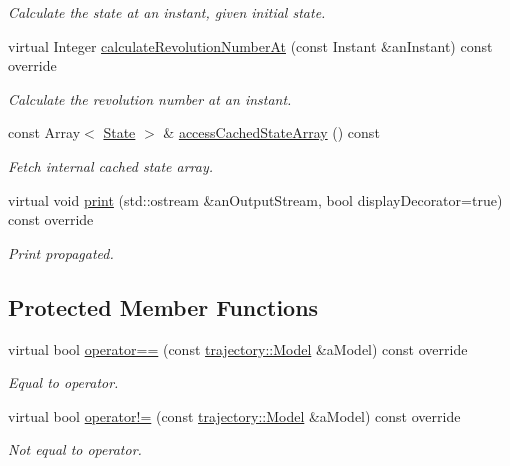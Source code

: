 \begin{DoxyCompactItemize}
\begin{DoxyCompactList}\small\item\em Calculate the state at an instant, given initial state. \end{DoxyCompactList}\item 
virtual Integer \hyperlink{classostk_1_1astro_1_1trajectory_1_1orbit_1_1models_1_1_propagated_a6360392c65494aa42aadff58ec58e49c}{calculate\+Revolution\+Number\+At} (const Instant \&an\+Instant) const override
\begin{DoxyCompactList}\small\item\em Calculate the revolution number at an instant. \end{DoxyCompactList}\item 
const Array$<$ \hyperlink{classostk_1_1astro_1_1trajectory_1_1_state}{State} $>$ \& \hyperlink{classostk_1_1astro_1_1trajectory_1_1orbit_1_1models_1_1_propagated_ab13c196dcea01238b6e1997cb46ced2b}{access\+Cached\+State\+Array} () const
\begin{DoxyCompactList}\small\item\em Fetch internal cached state array. \end{DoxyCompactList}\item 
virtual void \hyperlink{classostk_1_1astro_1_1trajectory_1_1orbit_1_1models_1_1_propagated_a2b8aa6ff5511dbe92e6a3e7f4dd6880b}{print} (std\+::ostream \&an\+Output\+Stream, bool display\+Decorator=true) const override
\begin{DoxyCompactList}\small\item\em Print propagated. \end{DoxyCompactList}\end{DoxyCompactItemize}
\subsection*{Protected Member Functions}
\begin{DoxyCompactItemize}
\item 
virtual bool \hyperlink{classostk_1_1astro_1_1trajectory_1_1orbit_1_1models_1_1_propagated_a29b52ccf653fbd84699edab0f198f590}{operator==} (const \hyperlink{classostk_1_1astro_1_1trajectory_1_1_model}{trajectory\+::\+Model} \&a\+Model) const override
\begin{DoxyCompactList}\small\item\em Equal to operator. \end{DoxyCompactList}\item 
virtual bool \hyperlink{classostk_1_1astro_1_1trajectory_1_1orbit_1_1models_1_1_propagated_aeffaddcde5540fd1226add8466415d08}{operator!=} (const \hyperlink{classostk_1_1astro_1_1trajectory_1_1_model}{trajectory\+::\+Model} \&a\+Model) const override
\begin{DoxyCompactList}\small\item\em Not equal to operator. \end{DoxyCompactList}\end{DoxyCompactItemize}
